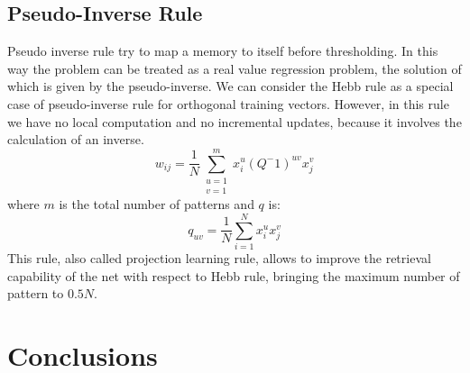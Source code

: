 \documentclass[letterpaper,twocolumn,10pt]{article}
\begin{document}
\subsection{Pseudo-Inverse Rule}
Pseudo inverse rule try to map a memory to itself before thresholding. In this way the problem can be treated as a real value regression problem, the solution of which is given by the pseudo-inverse. We can consider the Hebb rule as a special case of pseudo-inverse rule for orthogonal training vectors. However, in this rule we have no local computation and no incremental updates, because it involves the calculation of an inverse.
\begin{displaymath}
	w_{ij} = \frac{1}{N} \sum_{\substack{u=1\\v=1    }}^m x_i^u (Q^-1)^{uv} x_j^v
\end{displaymath}
where $m$ is the total number of patterns and $q$ is:
\begin{displaymath}
	q_{uv} = \frac{1}{N} \sum_{i=1}^N x_i^u x_j^v
\end{displaymath}
This rule, also called projection learning rule, allows to improve the retrieval capability of the net with respect to Hebb rule, bringing the maximum number of pattern to $0.5N$.


\section{Conclusions}

\cite{pelillo} 






\vfill
\break

\end{document}
